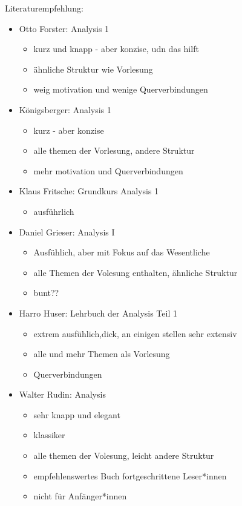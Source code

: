 \documentclass[consecutivenumbering]{gadsescript}
\begin{document}
Literaturempfehlung:
\begin{itemize}
	\item Otto Forster: Analysis 1
		\begin{itemize}
			\item kurz und knapp - aber konzise, udn das hilft
			\item ähnliche Struktur wie Vorlesung
			\item weig motivation und wenige Querverbindungen
		\end{itemize}
	\item Königsberger: Analysis 1
		\begin{itemize}
			\item kurz - aber konzise
			\item alle themen der Vorlesung, andere Struktur
			\item mehr motivation und Querverbindungen
		\end{itemize}
	\item Klaus Fritsche: Grundkurs Analysis 1
		\begin{itemize}
			\item ausführlich
		\end{itemize}
	\item Daniel Grieser: Analysis I
		\begin{itemize}
			\item Ausfühlich, aber mit Fokus auf das Wesentliche
			\item alle Themen der Volesung enthalten, ähnliche Struktur
			\item bunt??
		\end{itemize}
	\item Harro Huser: Lehrbuch der Analysis Teil 1
		\begin{itemize}
			\item extrem ausfühlich,dick, an einigen stellen sehr extensiv
			\item alle und mehr Themen als Vorlesung
			\item Querverbindungen
		\end{itemize}
	\item Walter Rudin: Analysis
		\begin{itemize}
			\item sehr knapp und elegant
			\item klassiker
			\item alle themen der Volesung, leicht andere Struktur
			\item empfehlenswertes Buch fortgeschrittene Leser*innen
			\item nicht für Anfänger*innen

\end{itemize}
\end{itemize}
\end{document}

